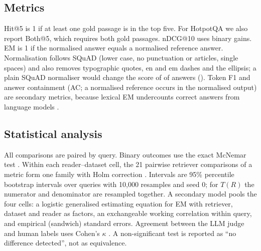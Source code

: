 \subsection{Metrics}\label{sec:metrics}
Hit@5 is 1 if at least one gold passage is in the top five. For HotpotQA we also report Both@5, which requires both gold passages. nDCG@10 uses binary gains. EM is 1 if the normalised answer equals a normalised reference answer. Normalisation follows SQuAD (lower case, no punctuation or articles, single spaces) and also removes typographic quotes, en and em dashes and the ellipsis; a plain SQuAD normaliser would change the score of  of  answers (). Token F1 and answer containment (AC; a normalised reference occurs in the normalised output) are secondary metrics, because lexical EM undercounts correct answers from language models \citep{kamalloo2023}.

\subsection{Statistical analysis}\label{sec:stats}
All comparisons are paired by query. Binary outcomes use the exact McNemar test \citep{mcnemar1947}. Within each reader--dataset cell, the 21 pairwise retriever comparisons of a metric form one family with Holm correction \citep{holm1979}. Intervals are 95\% percentile bootstrap intervals over queries \citep{efron1993bootstrap} with 10,000 resamples and seed 0; for $T(R)$ the numerator and denominator are resampled together. A secondary model pools the four cells: a logistic generalised estimating equation \citep{liang1986gee} for EM with retriever, dataset and reader as factors, an exchangeable working correlation within query, and empirical (sandwich) standard errors. Agreement between the LLM judge and human labels uses Cohen's $\kappa$ \citep{cohen1960kappa,landis1977}. A non-significant test is reported as ``no difference detected'', not as equivalence.

